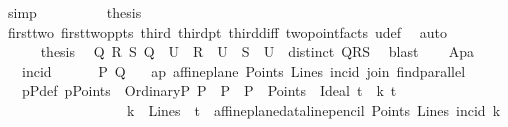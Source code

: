 \begin{isabellebody}
\ simp\isanewline
\isanewline
\ \ \ \ \ \ \isamarkupfalse%
\ \isamarkupfalse%
\ {\isacharquery}{\kern0pt}thesis\ \isamarkupfalse%
\ first{\isacharunderscore}{\kern0pt}two\ first{\isacharunderscore}{\kern0pt}two{\isacharunderscore}{\kern0pt}ppts\ third\ third{\isacharunderscore}{\kern0pt}pt\ third{\isacharunderscore}{\kern0pt}diff\ two{\isacharunderscore}{\kern0pt}point{\isacharunderscore}{\kern0pt}facts\ u{\isacharunderscore}{\kern0pt}def\ \isamarkupfalse%
\ auto\isanewline
\ \ \ \ \isamarkupfalse%
\isanewline
\ \ \ \ \isamarkupfalse%
\ {\isacharquery}{\kern0pt}thesis\ \isamarkupfalse%
\ {\isacartoucheopen}{\isasymexists}Q\ R\ S{\isachardot}{\kern0pt}\ Q\ {\isasymin}\ U\ {\isasymand}\ R\ {\isasymin}\ U\ {\isasymand}\ S\ {\isasymin}\ U\ {\isasymand}\ distinct\ {\isacharbrackleft}{\kern0pt}Q{\isacharcomma}{\kern0pt}R{\isacharcomma}{\kern0pt}S{\isacharbrackright}{\kern0pt}{\isacartoucheclose}\ \isamarkupfalse%
\ blast\isanewline
\ \ \isamarkupfalse%
\isanewline
{}\isamarkupfalse%
%
\endisatagproof
{\isafoldproof}%
%
\isadelimproof
%
\endisadelimproof
\isanewline
\isanewline
\isanewline
{}\isamarkupfalse%
\ Ap{}a{\isacharcolon}{\kern0pt}\isanewline
\ \ \ incid\ {\isacharparenleft}{\kern0pt}\ {\isachardoublequoteopen}{\isasymlhd}{\isachardoublequoteclose}\ {}{}{\isacharparenright}{\kern0pt}\isanewline
\ \ \ P\ Q\isanewline
\ \ \ ap{\isacharcolon}{\kern0pt}\ {\isachardoublequoteopen}affine{\isacharunderscore}{\kern0pt}plane\ Points\ Lines\ incid\ join\ find{\isacharunderscore}{\kern0pt}parallel{\isachardoublequoteclose}\isanewline
\ \ \ pPdef{\isacharcolon}{\kern0pt}\ {\isachardoublequoteopen}pPoints\ {\isasymequiv}\ {\isacharbraceleft}{\kern0pt}OrdinaryP\ P\ {\isacharbar}{\kern0pt}\ P\ {\isachardot}{\kern0pt}\ {\isacharparenleft}{\kern0pt}P\ {\isasymin}\ Points{\isacharparenright}{\kern0pt}{\isacharbraceright}{\kern0pt}\ {\isasymunion}\ {\isacharbraceleft}{\kern0pt}Ideal\ t\ {\isacharbar}{\kern0pt}\ k\ t\ {\isachardot}{\kern0pt}\ \isanewline
\ \ \ \ \ \ \ \ \ \ \ \ \ \ \ \ \ \ {\isacharparenleft}{\kern0pt}{\isacharparenleft}{\kern0pt}k\ {\isasymin}\ Lines{\isacharparenright}{\kern0pt}\ {\isasymand}\ {\isacharparenleft}{\kern0pt}t\ {\isacharequal}{\kern0pt}\ affine{\isacharunderscore}{\kern0pt}plane{\isacharunderscore}{\kern0pt}data{\isachardot}{\kern0pt}line{\isacharunderscore}{\kern0pt}pencil\ Points\ Lines\ {\isacharparenleft}{\kern0pt}incid{\isacharparenright}{\kern0pt}\ k{\isacharparenright}{\kern0pt}\ {\isacharparenright}{\kern0pt}{\isacharbraceright}{\kern0pt}{\isachardoublequoteclose}\isanewline

\end{isabellebody}
